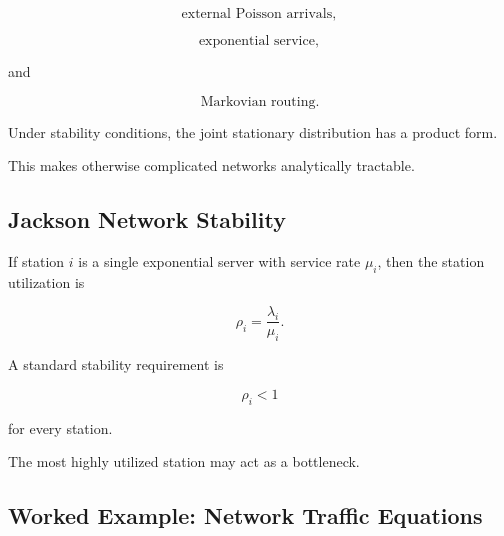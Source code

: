 \[
\boxed{
\text{external Poisson arrivals},
}
\]

\[
\boxed{
\text{exponential service},
}
\]

and

\[
\boxed{
\text{Markovian routing}.
}
\]

Under stability conditions, the joint stationary distribution has a
product form.

This makes otherwise complicated networks analytically tractable.

\subsection{Jackson Network Stability}
\label{subsec:jackson-network-stability}

If station \(i\) is a single exponential server with service rate
\(\mu_i\), then the station utilization is

\[
\boxed{
\rho_i
=
\frac{
\lambda_i
}{
\mu_i
}.
}
\]

A standard stability requirement is

\[
\boxed{
\rho_i<1
}
\]

for every station.

The most highly utilized station may act as a bottleneck.

\subsection{Worked Example: Network Traffic Equations}
\label{subsec:worked-network-traffic}

